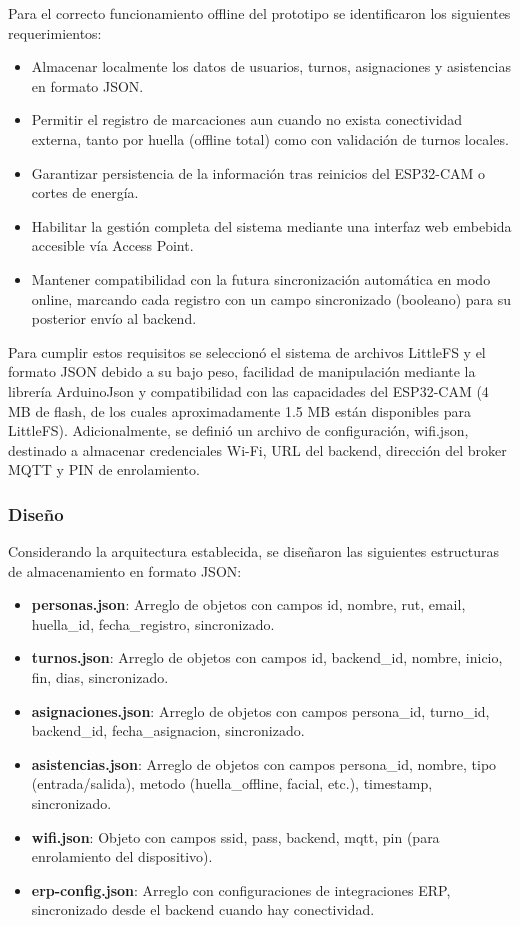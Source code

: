 Para el correcto funcionamiento offline del prototipo se identificaron los siguientes requerimientos:

\begin{itemize}
    \item Almacenar localmente los datos de usuarios, turnos, asignaciones y asistencias en formato JSON.
    \item Permitir el registro de marcaciones aun cuando no exista conectividad externa, tanto por huella (offline total) como con validación de turnos locales.
    \item Garantizar persistencia de la información tras reinicios del ESP32-CAM o cortes de energía.
    \item Habilitar la gestión completa del sistema mediante una interfaz web embebida accesible vía Access Point.
    \item Mantener compatibilidad con la futura sincronización automática en modo online, marcando cada registro con un campo sincronizado (booleano) para su posterior envío al backend.
\end{itemize}

Para cumplir estos requisitos se seleccionó el sistema de archivos LittleFS y el formato JSON debido a su bajo peso, facilidad de manipulación mediante la librería ArduinoJson y compatibilidad con las capacidades del ESP32-CAM (4 MB de flash, de los cuales aproximadamente 1.5 MB están disponibles para LittleFS). Adicionalmente, se definió un archivo de configuración, wifi.json, destinado a almacenar credenciales Wi-Fi, URL del backend, dirección del broker MQTT y PIN de enrolamiento.

\subsubsection{Diseño}

Considerando la arquitectura establecida, se diseñaron las siguientes estructuras de almacenamiento en formato JSON:

\begin{itemize}
    \item \textbf{personas.json}: Arreglo de objetos con campos id, nombre, rut, email, huella\_id, fecha\_registro, sincronizado.
    \item \textbf{turnos.json}: Arreglo de objetos con campos id, backend\_id, nombre, inicio, fin, dias, sincronizado.
    \item \textbf{asignaciones.json}: Arreglo de objetos con campos persona\_id, turno\_id, backend\_id, fecha\_asignacion, sincronizado.
    \item \textbf{asistencias.json}: Arreglo de objetos con campos persona\_id, nombre, tipo (entrada/salida), metodo (huella\_offline, facial, etc.), timestamp, sincronizado.
    \item \textbf{wifi.json}: Objeto con campos ssid, pass, backend, mqtt, pin (para enrolamiento del dispositivo).
    \item \textbf{erp-config.json}: Arreglo con configuraciones de integraciones ERP, sincronizado desde el backend cuando hay conectividad.
\end{itemize}

